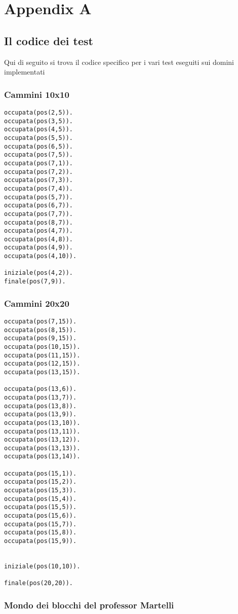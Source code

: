 \appendix
\chapter{Appendix A}

\section{Il codice dei test}
Qui di seguito si trova il codice specifico per i vari test eseguiti sui domini implementati

\subsection{Cammini 10x10}

\begin{lstlisting}
occupata(pos(2,5)).
occupata(pos(3,5)).
occupata(pos(4,5)).
occupata(pos(5,5)).
occupata(pos(6,5)).
occupata(pos(7,5)).
occupata(pos(7,1)).
occupata(pos(7,2)).
occupata(pos(7,3)).
occupata(pos(7,4)).
occupata(pos(5,7)).
occupata(pos(6,7)).
occupata(pos(7,7)).
occupata(pos(8,7)).
occupata(pos(4,7)).
occupata(pos(4,8)).
occupata(pos(4,9)).
occupata(pos(4,10)).

iniziale(pos(4,2)).
finale(pos(7,9)).
\end{lstlisting}

\subsection{Cammini 20x20}

\begin{lstlisting}
occupata(pos(7,15)).
occupata(pos(8,15)).
occupata(pos(9,15)).
occupata(pos(10,15)).
occupata(pos(11,15)).
occupata(pos(12,15)).
occupata(pos(13,15)).

occupata(pos(13,6)).
occupata(pos(13,7)).
occupata(pos(13,8)).
occupata(pos(13,9)).
occupata(pos(13,10)).
occupata(pos(13,11)).
occupata(pos(13,12)).
occupata(pos(13,13)).
occupata(pos(13,14)).

occupata(pos(15,1)).
occupata(pos(15,2)).
occupata(pos(15,3)).
occupata(pos(15,4)).
occupata(pos(15,5)).
occupata(pos(15,6)).
occupata(pos(15,7)).
occupata(pos(15,8)).
occupata(pos(15,9)).


iniziale(pos(10,10)).

finale(pos(20,20)).
\end{lstlisting}

\subsection{Mondo dei blocchi del professor Martelli}

